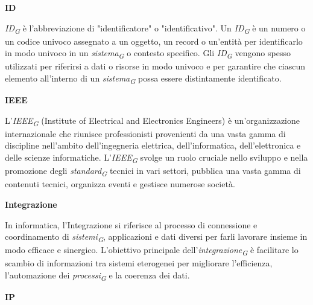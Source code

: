 \documentclass{article}
\begin{document}
\vspace{0.4cm}

\textbf{ID}

\vspace{0.1cm}

\textit{ID}\textsubscript{\textit{G}} è l'abbreviazione di "identificatore" o "identificativo". Un \textit{ID}\textsubscript{\textit{G}} è un numero o un codice univoco assegnato a un oggetto, un record o un'entità per identificarlo in modo univoco in un \textit{sistema}\textsubscript{\textit{G}} o contesto specifico. Gli \textit{ID}\textsubscript{\textit{G}} vengono spesso utilizzati per riferirsi a dati o risorse in modo univoco e per garantire che ciascun elemento all'interno di un \textit{sistema}\textsubscript{\textit{G}} possa essere distintamente identificato.

\vspace{0.4cm}

\textbf{IEEE}

\vspace{0.1cm}

L'\textit{IEEE}\textsubscript{\textit{G}} (Institute of Electrical and Electronics Engineers) è un'organizzazione internazionale che riunisce professionisti provenienti da una vasta gamma di discipline nell'ambito dell'ingegneria elettrica, dell'informatica, dell'elettronica e delle scienze informatiche. L'\textit{IEEE}\textsubscript{\textit{G}} svolge un ruolo cruciale nello sviluppo e nella promozione degli \textit{standard}\textsubscript{\textit{G}} tecnici in vari settori, pubblica una vasta gamma di contenuti tecnici, organizza eventi e gestisce numerose società.

\vspace{0.4cm}

\textbf{Integrazione}

\vspace{0.1cm}

In informatica, l'Integrazione si riferisce al processo di connessione e coordinamento di \textit{sistemi}\textsubscript{\textit{G}}, applicazioni e dati diversi per farli lavorare insieme in modo efficace e sinergico. L'obiettivo principale dell'\textit{integrazione}\textsubscript{\textit{G}} è facilitare lo scambio di informazioni tra sistemi eterogenei per migliorare l'efficienza, l'automazione dei \textit{processi}\textsubscript{\textit{G}} e la coerenza dei dati.

\vspace{0.4cm}

\textbf{IP}
\end{document}
